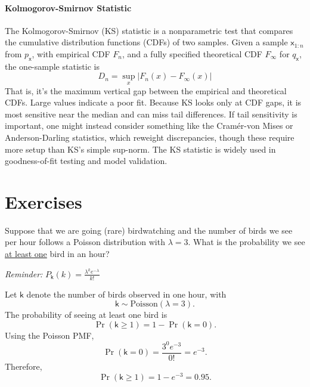 \paragraph{Kolmogorov-Smirnov Statistic} The Kolmogorov-Smirnov (KS) statistic is a nonparametric test that compares the cumulative distribution functions (CDFs) of two samples.  Given a sample $\mathsf{x}_{1:n}$ from $p_{\mathsf{x}}$, with empirical CDF $F_n$, and a fully specified theoretical CDF $F_{\infty}$ for $q_{\mathsf{x}}$, the one-sample statistic is 
\begin{equation}
    D_n=\sup_x |F_n(x)-F_\infty(x)|
\end{equation}
That is, it's the maximum vertical gap between the empirical and theoretical CDFs. Large values indicate a poor fit. Because KS looks only at CDF gaps, it is most sensitive near the median and can miss tail differences. If tail sensitivity is important, one might instead consider something like the Cram\'er-von Mises or Anderson-Darling statistics, which reweight discrepancies, though these require more setup than KS's simple sup-norm. The KS statistic is widely used in goodness-of-fit testing and model validation.


\section{Exercises}

\begin{exercise} %
    Suppose that we are going (rare) birdwatching and the number of birds we see per hour follows a Poisson distribution with $\lambda = 3$. What is the probability we see \underline{at least one} bird in an hour?

    \textit{Reminder:} $\displaystyle P_{\mathsf{k}}(k) = \frac{\lambda^k e^{-\lambda}}{k!}$
\end{exercise}

\begin{solution}
    Let $\mathsf{k}$ denote the number of birds observed in one hour, with
    \[
        \mathsf{k} \sim \text{Poisson}(\lambda=3).
    \]
    The probability of seeing at least one bird is
    \[
        \Pr(\mathsf{k} \ge 1) = 1 - \Pr(\mathsf{k}=0).
    \]
    Using the Poisson PMF,
    \[
        \Pr(\mathsf{k}=0) = \frac{3^0 e^{-3}}{0!} = e^{-3}.
    \]
    Therefore,
    \[
        \Pr(\mathsf{k} \ge 1) = 1 - e^{-3} = 0.95.
    \]
\end{solution}


